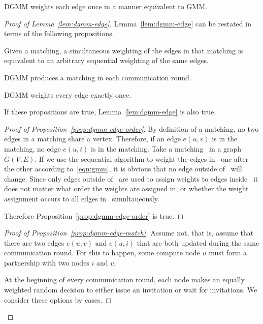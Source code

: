 \begin{lem}
\label{lem:dgmm-edge}
  DGMM weights each edge once in a manner equivalent to GMM.
\end{lem}
\begin{proof}[Proof of Lemma~\ref{lem:dgmm-edge}]
  Lemma~\ref{lem:dgmm-edge} can be restated in terms of the following propositions.
  \begin{lprp}
    \label{prop:dgmm-edge-order}
    Given a matching, a simultaneous weighting of the edges in that matching is equivalent to an arbitrary sequential weighting of the same edges.
  \end{lprp}
  \begin{lprp}
    \label{prop:dgmm-edge-match}
    DGMM produces a matching in each communication round.
  \end{lprp}
  \begin{lprp}
    \label{prop:dgmm-edge-once}
    DGMM weights every edge exactly once.
  \end{lprp}
  If these propositions are true, Lemma~\ref{lem:dgmm-edge} is also true. 
  
  \begin{proof}[Proof of Proposition~\ref{prop:dgmm-edge-order}]
    By definition of a matching, no two edges in a matching share a vertex. Therefore, if an edge $e(u,v)$ is in the matching, no edge $e(u,i)$ is in the matching. 
    Take a matching \bMd\ in a graph $G(V,E)$. If we use the sequential algorithm to weight the edges in \bMd\ one after the other according to~\eqref{eqn:gmm}, it is obvious that no edge outside of \bMd\ will change. Since only edges outside of \bMd\ are used to assign weights to edges inside \bMd\, it does not matter what order the weights are assigned in, or whether the weight assignment occurs to all edges in \bMd\ simultaneously.
    
    Therefore Proposition~\ref{prop:dgmm-edge-order} is true.
  \end{proof}
  \begin{proof}[Proof of Proposition~\ref{prop:dgmm-edge-match}]
    Assume not, that is, assume that there are two edges $e(u,v) \text{ and } e(u,i)$ that are both updated during the same communication round. For this to happen, some compute node $u$ must form a partnership with two nodes $i$ and $v$. 
    
At the beginning of every communication round, each node makes an equally weighted random decision to either issue an invitation or wait for invitations. We consider these options by cases.


\end{proof}
\end{proof}
